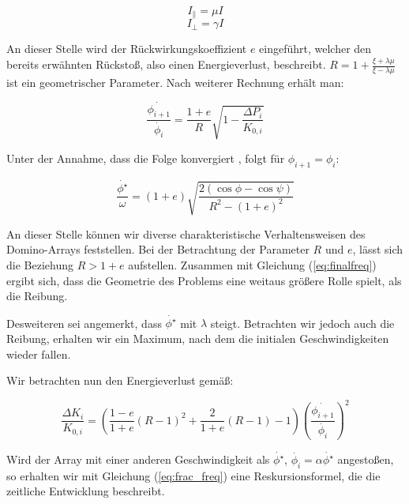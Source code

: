 \begin{equation}
	\label{eq:parallel}
	I_{\parallel} = \mu I
\end{equation}
\begin{equation}
    \label{eq:senkrecht}
    I_{\perp} = \gamma I
\end{equation}

An dieser Stelle wird der Rückwirkungskoeffizient $e$ eingeführt, welcher den bereits erwähnten Rückstoß, also einen Energieverlust, beschreibt. $R = 1 + \frac{\xi + \lambda\mu}{\xi - \lambda\mu}$ ist ein geometrischer Parameter. Nach weiterer Rechnung erhält man:

\begin{equation}
    \label{eq:frac_init}
	\frac{\dot{\phi_{i+1}}}{\dot{\phi_{i}}} = \frac{1+e}{R} \sqrt{1 - \frac{\Delta P_i}{K_{0,i}}}
\end{equation}

Unter der Annahme, dass die Folge konvergiert \cite{Stronge87}, folgt für $ \phi_{i+1} = \phi_{i} $:

\begin{equation}
    \label{eq:finalfreq}
	\frac{\dot{\phi^{\star}}}{\omega} = (1+e)\sqrt{\frac{2(\cos\phi - \cos\psi)}{R^2 - (1+e)^2}}
\end{equation}

An dieser Stelle können wir diverse charakteristische Verhaltensweisen des Domino-Arrays feststellen. Bei der Betrachtung der Parameter $R$ und $e$, lässt sich die Beziehung $ R > 1+e $ aufstellen. Zusammen mit Gleichung (\ref{eq:finalfreq}) ergibt sich, dass die Geometrie des Problems eine weitaus größere Rolle spielt, als die Reibung. 

Desweiteren sei angemerkt, dass $\dot{\phi^{\star}}$ mit $\lambda$ steigt. Betrachten wir jedoch auch die Reibung, erhalten wir ein Maximum, nach dem die initialen Geschwindigkeiten wieder fallen.

Wir betrachten nun den Energieverlust gemäß:

\begin{equation}
    \label{eq:energyloss}
    \frac{\Delta K_i}{K_{0,i}} = (\frac{1-e}{1+e} (R-1)^2 + \frac{2}{1+e} (R-1) - 1)(\frac{\dot{\phi_{i+1}}}{\dot{\phi_{i}}})^2
\end{equation}

Wird der Array mit einer anderen Geschwindigkeit als $\dot{\phi^{\star}}$, $\dot{\phi_i} = \alpha \dot{\phi^{\star}}$ angestoßen, so erhalten wir mit Gleichung (\ref{eq:frac_freq}) eine Reskursionsformel, die die zeitliche Entwicklung beschreibt.
